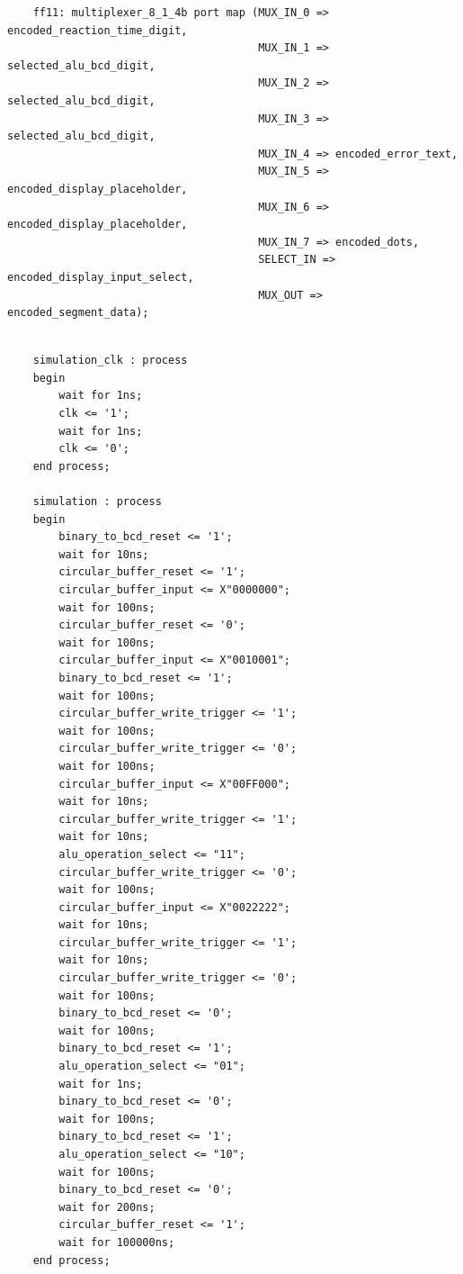 \documentclass[11pt]{article}
\newenvironment{code}{\captionsetup{type=listing}}{}
\begin{document}
\begin{code}
  \begin{verbatim}
    ff11: multiplexer_8_1_4b port map (MUX_IN_0 => encoded_reaction_time_digit,
                                       MUX_IN_1 => selected_alu_bcd_digit,
                                       MUX_IN_2 => selected_alu_bcd_digit,
                                       MUX_IN_3 => selected_alu_bcd_digit,
                                       MUX_IN_4 => encoded_error_text,
                                       MUX_IN_5 => encoded_display_placeholder,
                                       MUX_IN_6 => encoded_display_placeholder,
                                       MUX_IN_7 => encoded_dots,
                                       SELECT_IN => encoded_display_input_select,
                                       MUX_OUT => encoded_segment_data);
  \end{verbatim}
  \captionsetup{belowskip=0pt}
  \label{code:output_select_mux_instantiation}
\end{code}

\vspace*{1cm}
\begin{code}
  \begin{verbatim}

    simulation_clk : process
    begin
        wait for 1ns;
        clk <= '1';
        wait for 1ns;
        clk <= '0';
    end process;

    simulation : process
    begin
        binary_to_bcd_reset <= '1';
        wait for 10ns;
        circular_buffer_reset <= '1';
        circular_buffer_input <= X"0000000";
        wait for 100ns;
        circular_buffer_reset <= '0';
        wait for 100ns;
        circular_buffer_input <= X"0010001";
        binary_to_bcd_reset <= '1';
        wait for 100ns;
        circular_buffer_write_trigger <= '1';
        wait for 100ns;
        circular_buffer_write_trigger <= '0';
        wait for 100ns;
        circular_buffer_input <= X"00FF000";
        wait for 10ns;
        circular_buffer_write_trigger <= '1';
        wait for 10ns;
        alu_operation_select <= "11";
        circular_buffer_write_trigger <= '0';
        wait for 100ns;
        circular_buffer_input <= X"0022222";
        wait for 10ns;
        circular_buffer_write_trigger <= '1';
        wait for 10ns;
        circular_buffer_write_trigger <= '0';
        wait for 100ns;
        binary_to_bcd_reset <= '0';
        wait for 100ns;
        binary_to_bcd_reset <= '1';
        alu_operation_select <= "01";
        wait for 1ns;
        binary_to_bcd_reset <= '0';
        wait for 100ns;
        binary_to_bcd_reset <= '1';
        alu_operation_select <= "10";
        wait for 100ns;
        binary_to_bcd_reset <= '0';
        wait for 200ns;
        circular_buffer_reset <= '1';
        wait for 100000ns;
    end process;
        

  \end{verbatim}
  \captionsetup{belowskip=0pt}
  \label{code:alu_testbench}
\end{code}
\end{document}
